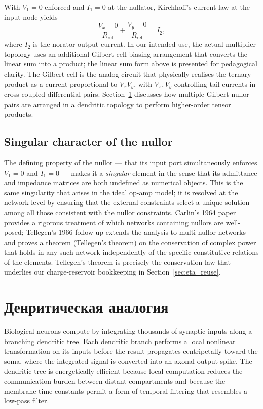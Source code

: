 With $V_1 = 0$ enforced and $I_1 = 0$ at the nullator, Kirchhoff's current law at the
input node yields
\[
  \frac{V_x - 0}{R_{\text{ref}}} + \frac{V_y - 0}{R_{\text{ref}}} = I_2,
\]
where $I_2$ is the norator output current.  In our intended use, the actual
multiplier topology uses an additional Gilbert-cell biasing arrangement that converts
the linear sum into a product; the linear sum form above is presented for pedagogical
clarity.  The Gilbert cell is the analog circuit that physically realises the ternary
product as a current proportional to $V_x V_y$, with $V_x, V_y$ controlling tail
currents in cross-coupled differential pairs.  Section~\ref{sec:dendritic} discusses
how multiple Gilbert-nullor pairs are arranged in a dendritic topology to perform
higher-order tensor products.

\subsection{Singular character of the nullor}
\label{subsec:singular}

The defining property of the nullor --- that its input port simultaneously enforces
$V_1 = 0$ and $I_1 = 0$ --- makes it a \emph{singular} element in the sense that its
admittance and impedance matrices are both undefined as numerical objects.  This is
the same singularity that arises in the ideal op-amp model; it is resolved at the
network level by ensuring that the external constraints select a unique solution
among all those consistent with the nullor constraints.  Carlin's 1964 paper
\cite{carlin1964singular} provides a rigorous treatment of which networks containing
nullors are well-posed; Tellegen's 1966 follow-up \cite{tellegen1966nullor} extends
the analysis to multi-nullor networks and proves a theorem (Tellegen's theorem) on the
conservation of complex power that holds in any such network independently of the
specific constitutive relations of the elements.  Tellegen's theorem is precisely the
conservation law that underlies our charge-reservoir bookkeeping in
Section~\ref{sec:eta_reuse}.

\section{Денритическая аналогия}
\label{sec:dendritic}

Biological neurons compute by integrating thousands of synaptic inputs along a
branching dendritic tree.  Each dendritic branch performs a local nonlinear
transformation on its inputs before the result propagates centripetally toward the
soma, where the integrated signal is converted into an axonal output spike.  The
dendritic tree is energetically efficient because local computation reduces the
communication burden between distant compartments and because the membrane time
constants permit a form of temporal filtering that resembles a low-pass filter.

